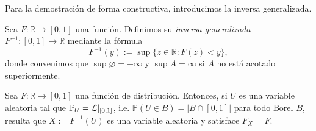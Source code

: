 Para la demostración de forma constructiva, introducimos la inversa generalizada.

\begin{definition}
    Sea \(F: \mathbb{R} \to [0,1]\) una función. Definimos su \textit{inversa generalizada} \(F^{-1}: [0,1] \to \overline{\mathbb{R}}\) mediante la fórmula
    \[
    F^{-1}(y) := \sup \{z \in \mathbb{R} : F(z) < y\},
    \]
    donde convenimos que \(\sup \varnothing = -\infty\) y \(\sup A = \infty\) si \(A\) no está acotado superiormente.
\end{definition}

\begin{lemma}
	Sea \(F: \mathbb{R} \to [0,1]\) una función de distribución. Entonces, si \(U\) es una variable aleatoria tal que \(\mathbb{P}_U = \mathcal{L}|_{[0,1]}\), i.e. \(\mathbb{P}(U \in B) = |B \cap [0,1]|\) para todo Borel \(B\), resulta que \(X := F^{-1}(U)\) es una variable aleatoria y satisface \(F_X = F\).
\end{lemma}

